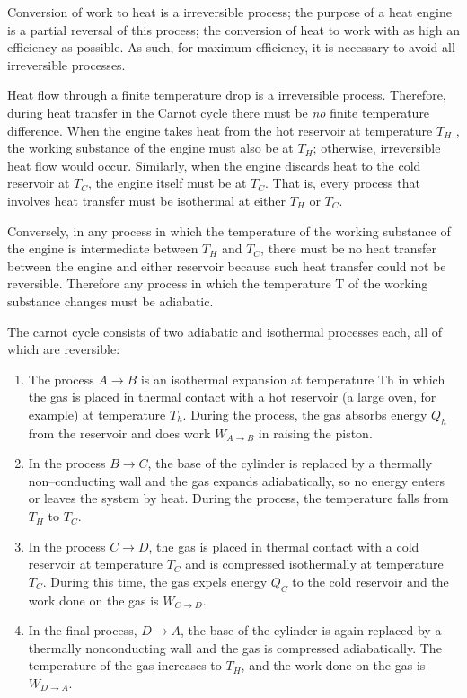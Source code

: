 Conversion of work to heat is a irreversible process; the purpose of a heat engine is a partial reversal of this process; the conversion of heat to work with as high an efficiency as possible. As such, for maximum efficiency, it is necessary to avoid all irreversible processes.

Heat flow through a finite temperature drop is a irreversible process. Therefore, during heat transfer in the Carnot cycle there must be \textit{no} finite temperature difference. When the engine takes heat from the hot reservoir at temperature $T_H$ , the working substance of the engine must also be at $T_H$;	otherwise, irreversible heat flow would occur. Similarly, when the engine discards heat to the cold reservoir at $T_C$, the engine itself must be at $T_C$. That is, every process that involves heat transfer must be isothermal at either $T_H$ or $T_C$.

Conversely, in any process in which the temperature of the working substance of the engine is intermediate between $T_H$ and $T_C$, there must be no heat transfer between the engine and either reservoir because such heat transfer could not be reversible. Therefore any process in which the temperature T of the working substance changes must be adiabatic.

The carnot cycle consists of two adiabatic and isothermal processes each, all of which are reversible:
\begin{enumerate}
\item The process $A \rightarrow B$ is an isothermal expansion at temperature Th in which the gas is placed in thermal contact with a hot reservoir (a large oven, for example) at temperature $T_h$. During the process, the gas absorbs energy $Q_{h}$ from the reservoir and does work $W_{A \rightarrow B}$ in raising the piston.
\item In the process $B \rightarrow C$, the base of the cylinder is replaced by a thermally non--conducting wall and the gas expands adiabatically, so no energy enters or leaves the system by heat. During the process, the temperature falls from $T_{H}$ to $T_{C}$.
\item In the process $C \rightarrow D$, the gas is placed in thermal contact with a cold reservoir at temperature $T_{C}$ and is compressed isothermally at temperature $T_{C}$. During this time, the gas expels energy $Q_{C}$ to the cold reservoir and the work done on the gas is $W_{C \rightarrow D}$.
\item In the final process, $D \rightarrow A$, the base of the cylinder is again replaced by a thermally nonconducting wall and the gas is compressed adiabatically. The temperature of the gas increases to $T_{H}$, and the work done on the gas is $W_{D \rightarrow A}$.
\end{enumerate}

